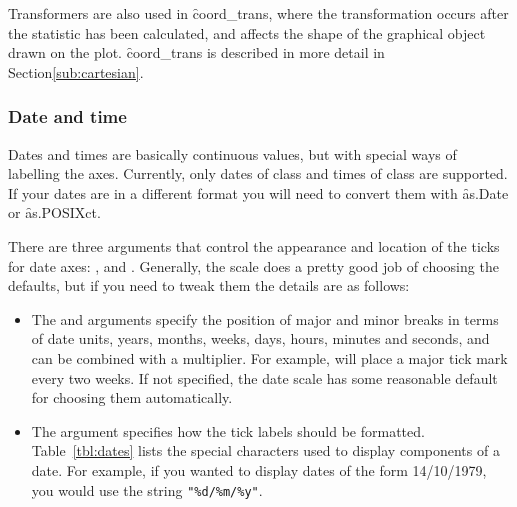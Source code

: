 Transformers are also used in \f{coord_trans}, where the transformation occurs after the statistic has been calculated, and affects the shape of the graphical object drawn on the plot. \f{coord_trans} is described in more detail in Section\ref{sub:cartesian}.

\subsubsection{Date and time}
\label{sub:scale-date}

Dates and times are basically continuous values, but with special ways of labelling the axes. Currently, only dates of class  and times of class  are supported. If your dates are in a different format you will need to convert them with \f{as.Date} or \f{as.POSIXct}.

There are three arguments that control the appearance and location of the ticks for date axes: ,  and . Generally, the scale does a pretty good job of choosing the defaults, but if you need to tweak them the details are as follows:

\begin{itemize}
  \item The  and  arguments specify the position of major and minor breaks in terms of date units, years, months, weeks, days, hours, minutes and seconds, and can be combined with a multiplier.  For example,  will place a major tick mark every two weeks.  If not specified, the date scale has some reasonable default for choosing them automatically.
  
  \item The  argument specifies how the tick labels should be formatted. Table~\ref{tbl:dates} lists the special characters used to display components of a date.  For example, if you wanted to display dates of the form 14/10/1979, you would use the string \verb|"%d/%m/%y"|.
\end{itemize}

